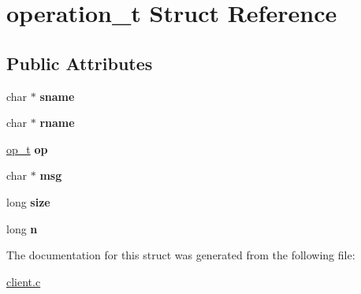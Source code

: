 \hypertarget{structoperation__t}{}\section{operation\+\_\+t Struct Reference}
\label{structoperation__t}
\subsection*{Public Attributes}
\begin{DoxyCompactItemize}
\item 
char $\ast$ {\bfseries sname}\hypertarget{structoperation__t_a7822f225cfc9123dab423ba683c1aace}{}\label{structoperation__t_a7822f225cfc9123dab423ba683c1aace}

\item 
char $\ast$ {\bfseries rname}\hypertarget{structoperation__t_a6889a2b00ba2ad2d34666eea3d59e736}{}\label{structoperation__t_a6889a2b00ba2ad2d34666eea3d59e736}

\item 
\hyperlink{ops_8h_ac6fa1b34da8872e34c2936391332f44c}{op\+\_\+t} {\bfseries op}\hypertarget{structoperation__t_afa66e43cb50d2792e12f7a2b054bc396}{}\label{structoperation__t_afa66e43cb50d2792e12f7a2b054bc396}

\item 
char $\ast$ {\bfseries msg}\hypertarget{structoperation__t_a3034fb2b256feb05ef6d4d034cb17265}{}\label{structoperation__t_a3034fb2b256feb05ef6d4d034cb17265}

\item 
long {\bfseries size}\hypertarget{structoperation__t_a453c2473442f61fbc268d30c8ebb4338}{}\label{structoperation__t_a453c2473442f61fbc268d30c8ebb4338}

\item 
long {\bfseries n}\hypertarget{structoperation__t_aa18a74143d24d04171d8b8206ae9d15b}{}\label{structoperation__t_aa18a74143d24d04171d8b8206ae9d15b}

\end{DoxyCompactItemize}


The documentation for this struct was generated from the following file\+:\begin{DoxyCompactItemize}
\item 
\hyperlink{client_8c}{client.\+c}\end{DoxyCompactItemize}
